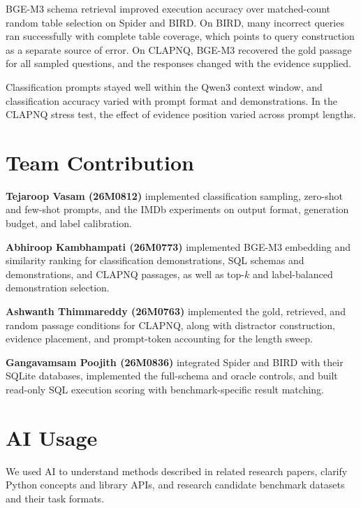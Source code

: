 \documentclass{article}
\begin{document}
BGE-M3 schema retrieval improved execution accuracy over matched-count random table selection on
Spider and BIRD. On BIRD, many incorrect queries ran successfully with complete table coverage,
which points to query construction as a separate source of error. On CLAPNQ, BGE-M3 recovered the
gold passage for all sampled questions, and the responses changed with the evidence supplied.

Classification prompts stayed well within the Qwen3 context window, and classification accuracy
varied with prompt format and demonstrations. In the CLAPNQ stress test, the effect of evidence
position varied across prompt lengths.

\clearpage


\section*{Team Contribution}

\textbf{Tejaroop Vasam (26M0812)} implemented classification sampling, zero-shot and few-shot
prompts, and the IMDb experiments on output format, generation budget, and label calibration.

\textbf{Abhiroop Kambhampati (26M0773)} implemented BGE-M3 embedding and similarity ranking for
classification demonstrations, SQL schemas and demonstrations, and CLAPNQ passages, as well as
top-\(k\) and label-balanced demonstration selection.

\textbf{Ashwanth Thimmareddy (26M0763)} implemented the gold, retrieved, and random passage conditions for CLAPNQ,
along with distractor construction, evidence placement, and prompt-token accounting for the
length sweep.

\textbf{Gangavamsam Poojith (26M0836)} integrated Spider and BIRD with their SQLite databases, implemented the
full-schema and oracle controls, and built read-only SQL execution scoring with
benchmark-specific result matching.

\section*{AI Usage}

We used AI to understand methods described in related research papers, clarify Python concepts and
library APIs, and research candidate benchmark datasets and their task formats.
\end{document}
